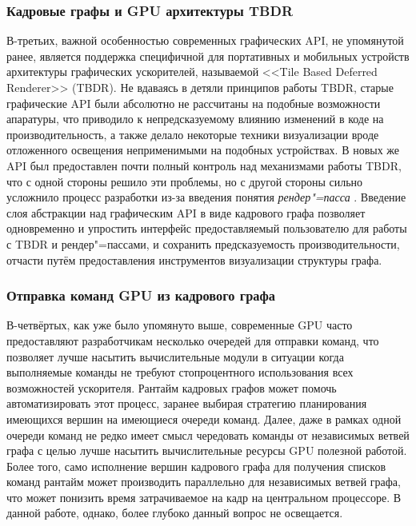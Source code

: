 \subsubsection{Кадровые графы и GPU архитектуры TBDR}
В-третьих, важной особенностью современных графических API, не упомянутой ранее, является поддержка специфичной для портативных и мобильных устройств архитектуры графических ускорителей, называемой <<Tile Based Deferred Renderer>> (TBDR).
Не вдаваясь в детяли принципов работы TBDR, старые графические API были абсолютно не рассчитаны на подобные возможности апаратуры, что приводило к непредсказуемому влиянию изменений в коде на производительность, а также делало некоторые техники визуализации вроде отложенного освещения неприменимыми на подобных устройствах.
В новых же API был предоставлен почти полный контроль над механизмами работы TBDR, что с одной стороны решило эти проблемы, но с другой стороны сильно усложнило процесс разработки из-за введения понятия \textit{рендер"=пасса} \cite[раздел~8]{VulkanSpec}.
Введение слоя абстракции над графическим API в виде кадрового графа позволяет одновременно и упростить интерфейс предоставляемый пользователю для работы с TBDR и рендер"=пассами, и сохранить предсказуемость производительности, отчасти путём предоставления инструментов визуализации структуры графа.

\subsubsection{Отправка команд GPU из кадрового графа}
В-четвёртых, как уже было упомянуто выше, современные GPU часто предоставляют разработчикам несколько очередей для отправки команд, что позволяет лучше насытить вычислительные модули в ситуации когда выполняемые команды не требуют стопроцентного использования всех возможностей ускорителя.
Рантайм кадровых графов может помочь автоматизировать этот процесс, заранее выбирая стратегию планирования имеющихся вершин на имеющиеся очереди команд.
Далее, даже в рамках одной очереди команд не редко имеет смысл чередовать команды от независимых ветвей графа с целью лучше насытить вычислительные ресурсы GPU полезной работой.
Более того, само исполнение вершин кадрового графа для получения списков команд рантайм может производить параллельно для независимых ветвей графа, что может понизить время затрачиваемое на кадр на центральном процессоре.
В данной работе, однако, более глубоко данный вопрос не освещается.

